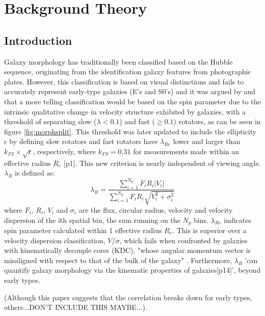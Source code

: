 
\chapter{Background Theory}

\label{ch:background}

\section{Introduction}
Galaxy morphology has traditionally been classified based on the Hubble sequence, originating from the identification galaxy features from photographic plates. However, this classification is based on visual distinctions and fails to accurately represent early-type galaxies (E's and S0's) and it was argued by \cite{Cappellari2011} and \cite{Emsellem2011} that a more telling classification would be based on the spin parameter due to the intrinsic qualitative change in velocity structure exhibited by galaxies, with a threshold of separating slow ($\lambda<0.1$) and fast ($\geq0.1$) rotators, as can be seen in figure \ref{fig:morphsplit}. This threshold was later updated to include the ellipticity $\epsilon$ by defining slow rotators and fast rotators have $\lambda_{Re}$ lower and larger than $k_{FS} \times \sqrt{\epsilon}$, respectively, where $k_{FS} = 0.31$ for measurements made within an effective radius $R_{e}$ \cite{Emsellem2011}[p1]. This new criterion is nearly independent of viewing angle.
$\lambda_{R}$ is defined as\cite{sauron9}:
\begin{equation}
\lambda_{R} = \frac{\sum_{i=1}^{N_{p}} F_{i}R_{i}|V_{i}|}{\sum_{i=1}^{N_{p}}F_{i}R_{i}\sqrt{V_{i}^2+\sigma_{i}^2}}
\end{equation}
where $F_i$, $R_i$, $V_i$ and $σ_i$ are the flux, circular radius, velocity and velocity dispersion of the ith spatial bin, the sum running on the $N_p$ bins. $\lambda_{Re}$ indicates spin parameter calculated within 1 effective radius $R_{e}$.
This is superior over a velocity dispersion classification, $V/\sigma$, which fails when confronted by galaxies with kinematically decouple cores (KDC), "whose angular momentum vector is misaligned with respect to that of the bulk of the galaxy" \cite{mo_bosch_white_2010}. Furthermore, $\lambda_{R}$ 'can quantify galaxy morphology via the kinematic properties of galaxies\cite{Cortese2016}[p14]', beyond early types. 

(Although this paper suggests that the correlation breaks down for early types, others...DON'T INCLUDE THIS MAYBE...).  

